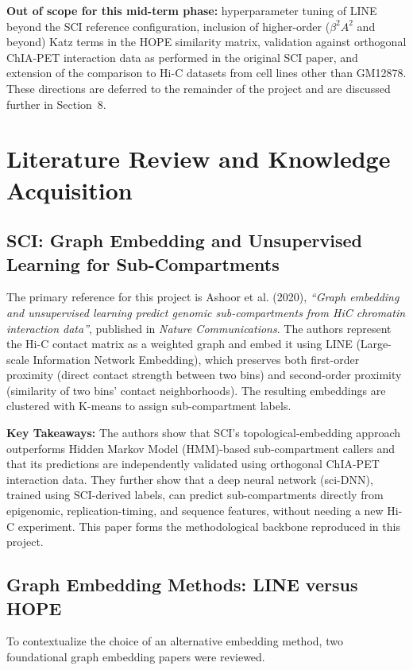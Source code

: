 \documentclass[12pt]{article}
\begin{document}
\textbf{Out of scope for this mid-term phase:} hyperparameter tuning of LINE beyond the SCI
reference configuration, inclusion of higher-order ($\beta^2 A^2$ and beyond) Katz terms in the
HOPE similarity matrix, validation against orthogonal ChIA-PET interaction data as performed in
the original SCI paper, and extension of the comparison to Hi-C datasets from cell lines other
than GM12878. These directions are deferred to the remainder of the project and are discussed
further in Section~8.


\section{Literature Review and Knowledge Acquisition}

\subsection{SCI: Graph Embedding and Unsupervised Learning for Sub-Compartments}
The primary reference for this project is Ashoor et al. (2020), \textit{``Graph embedding and
unsupervised learning predict genomic sub-compartments from HiC chromatin interaction data''},
published in \textit{Nature Communications}. The authors represent the Hi-C contact matrix as a
weighted graph and embed it using LINE (Large-scale Information Network Embedding), which
preserves both first-order proximity (direct contact strength between two bins) and second-order
proximity (similarity of two bins' contact neighborhoods). The resulting embeddings are clustered
with K-means to assign sub-compartment labels.

\textbf{Key Takeaways:} The authors show that SCI's topological-embedding approach outperforms
Hidden Markov Model (HMM)-based sub-compartment callers and that its predictions are
independently validated using orthogonal ChIA-PET interaction data. They further show that a
deep neural network (sci-DNN), trained using SCI-derived labels, can predict sub-compartments
directly from epigenomic, replication-timing, and sequence features, without needing a new Hi-C
experiment. This paper forms the methodological backbone reproduced in this project.

\subsection{Graph Embedding Methods: LINE versus HOPE}
To contextualize the choice of an alternative embedding method, two foundational graph embedding
papers were reviewed.
\end{document}

